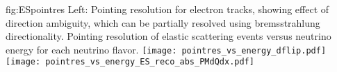 



\begin{dunefigure}{fig:ESpointres}{ Left: Pointing resolution for electron
    tracks, showing effect of direction ambiguity, which can be
    partially resolved using bremsstrahlung directionality. Pointing resolution of elastic scattering
    events versus neutrino energy for each neutrino flavor.}
\texttt{[image: pointres\_vs\_energy\_dflip.pdf]}
\texttt{[image: pointres\_vs\_energy\_ES\_reco\_abs\_PMdQdx.pdf]}
\end{dunefigure}





